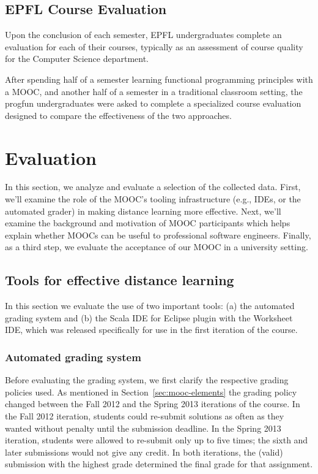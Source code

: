 \documentclass{sig-alternate}
\begin{document}
\subsection{EPFL Course Evaluation}

Upon the conclusion of each semester, EPFL undergraduates complete an evaluation for
each of their courses, typically as an assessment of course quality for the Computer
Science department.

After spending half of a semester learning functional programming principles with a
MOOC, and another half of a semester in a traditional classroom setting, the progfun
undergraduates were asked to complete a specialized course evaluation designed to compare
the effectiveness of the two approaches.

\section{Evaluation}
\label{sec:eval}

In this section, we analyze and evaluate a selection of the collected data.
First, we'll examine the role of the MOOC's tooling infrastructure
(e.g., IDEs, or the automated grader) in making distance learning more effective.
Next, we'll examine the background and motivation of MOOC participants which helps
explain whether MOOCs can be useful to professional software engineers. Finally,
as a third step, we evaluate the acceptance of our MOOC in a university setting.

\subsection{Tools for effective distance learning}

In this section we evaluate the use of two important tools: (a) the automated
grading system and (b) the Scala IDE for Eclipse plugin with the Worksheet IDE,
which was released specifically for use in the first iteration of the course.

\subsubsection{Automated grading system}

Before evaluating the grading system, we first clarify the respective grading
policies used. As mentioned in Section~\ref{sec:mooc-elements} the grading
policy changed between the Fall 2012 and the Spring 2013 iterations of the
course. In the Fall 2012 iteration, students could re-submit solutions as
often as they wanted without penalty until the submission deadline. In the
Spring 2013 iteration, students were allowed to re-submit only up to five
times; the sixth and later submissions would not give any credit. In both
iterations, the (valid) submission with the highest grade determined the final
grade for that assignment.
\end{document}
